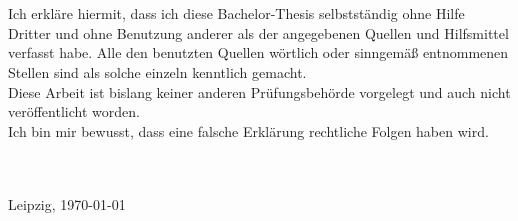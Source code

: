 \chapter*{\thesisAffidavitName}

Ich erkläre hiermit, dass ich diese Bachelor-Thesis selbstständig ohne Hilfe Dritter und ohne Benutzung anderer als der angegebenen Quellen und Hilfsmittel verfasst habe. Alle den benutzten Quellen wörtlich oder sinngemäß entnommenen Stellen sind als solche einzeln kenntlich gemacht.\\
Diese Arbeit ist bislang keiner anderen Prüfungsbehörde vorgelegt und auch nicht veröffentlicht worden.\\
Ich bin mir bewusst, dass eine falsche Erklärung rechtliche Folgen haben wird.

{
\vspace{32pt}
\noindent
\hdashrule{5cm}{1pt}{1pt 3pt}\\
\textbf{\thesisAuthor{}}\\
Leipzig, \today
}
